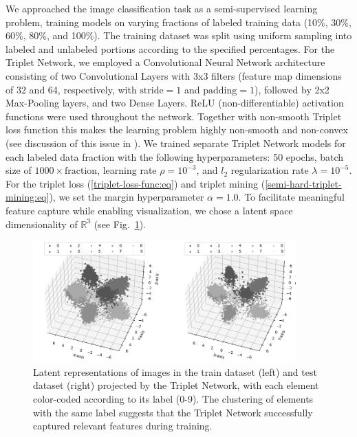 We approached the image classification task as a semi-supervised learning problem, training models on varying fractions of labeled training data (10\%, 30\%, 60\%, 80\%, and 100\%). The training dataset was split using uniform sampling into labeled and unlabeled portions according to the specified percentages. For the Triplet Network, we employed a Convolutional Neural Network architecture consisting of two Convolutional Layers with 3x3 filters (feature map dimensions of 32 and 64, respectively, with $\text{stride}=1$ and $\text{padding}=1$), followed by 2x2 Max-Pooling layers, and two Dense Layers. ReLU (non-differentiable) activation functions were used throughout the network. Together with non-smooth Triplet loss function this makes the learning problem highly non-smooth and non-convex (see discussion of this issue in \cite{Norkin_2021}). We trained separate Triplet Network models for each labeled data fraction with the following hyperparameters: 50 epochs, batch size of $1000 \times \text{fraction}$, learning rate $\rho = 10^{-3}$, and $l_2$ regularization rate $\lambda = 10^{-5}$. For the triplet loss (\ref{triplet-loss-func:eq}) and triplet mining (\ref{semi-hard-triplet-mining:eq}), we set the margin hyperparameter $\alpha = 1.0$. To facilitate meaningful feature capture while enabling visualization, we chose a latent space dimensionality of $\mathbb{R}^3$ (see Fig.~\ref{latent-space:fig}).
\begin{figure}
    \centering
    \includegraphics[width=0.9\textwidth]{figures/latent_space.png}
    \caption{Latent representations of images in the train dataset (left) and test dataset (right) projected by the Triplet Network, with each element color-coded according to its label (0-9). The clustering of elements with the same label suggests that the Triplet Network successfully captured relevant features during training.}
    \label{latent-space:fig}
\end{figure}

